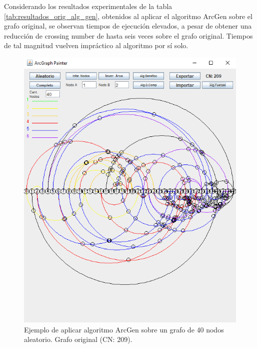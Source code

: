 Considerando  los resultados experimentales de  la tabla \ref{tab:resultados_orig_alg_gen},  obtenidos al aplicar el algoritmo ArcGen sobre el grafo original, se observan tiempos de ejecución elevados, a pesar de obtener una reducción de crossing number de hasta seis veces sobre el grafo original. Tiempos de tal magnitud vuelven impráctico al algoritmo por sí solo.

\begin{figure}
	\centering
		\includegraphics[scale=0.7]{imagenes/grafo_example_ori.png}
	\caption{Ejemplo de aplicar algoritmo ArcGen sobre un grafo de 40 nodos aleatorio. Grafo original (CN: 209).}
	\label{fig1:resultado_ejemplo_grafo_ori_gen}
\end{figure}

